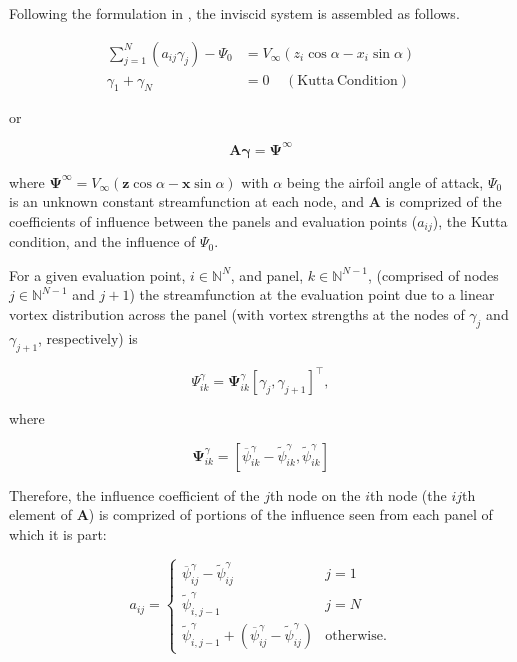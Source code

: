 \documentclass[]{article}
\newcommand{\vect}{\mathbf}
\begin{document}
Following the formulation in \cite{fidkowski_coupled_2022}, the inviscid system is assembled as follows.

\begin{equation}
\begin{aligned}
	\sum_{j=1}^N(a_{ij}\gamma_j) - \Psi_0 &= V_\infty(z_i\cos\alpha - x_i\sin\alpha) \\
	\gamma_1 + \gamma_N &= 0 ~~~~~\mathrm{(Kutta~Condition)}
\end{aligned}
\end{equation}

\noindent or

\begin{equation}
	\mathbf{A} \mathbf{\gamma} = \mathbf{\Psi}^\infty
\end{equation}

\noindent where \(\mathbf{\Psi}^\infty = V_\infty(\vect{z}\cos\alpha - \vect{x} \sin\alpha)\) with \(\alpha\) being the airfoil angle of attack, \(\Psi_0\) is an unknown constant streamfunction at each node, and  \(\mathbf{A}\) is comprized of the coefficients of influence between the panels and evaluation points (\(a_{ij}\)), the Kutta condition, and the influence of \(\Psi_0\).

For a given evaluation point, \(i \in \mathbb{N}^N\), and panel, \(k \in \mathbb{N}^{N-1}\), (comprised of nodes \(j \in \mathbb{N}^{N-1}\) and \(j+1\)) the streamfunction at the evaluation point due to a linear vortex distribution across the panel (with vortex strengths at the nodes of \(\gamma_j\) and \(\gamma_{j+1}\), respectively) is

\begin{equation}
	\Psi_{ik}^\gamma = \mathbf{\Psi}^\gamma_{ik} [\gamma_j, \gamma_{j+1}]^\top,
\end{equation}

\noindent where

\begin{equation}
	\mathbf{\Psi}^\gamma_{ik} = \left[\overline{\psi}^\gamma_{ik} - \widetilde{\psi}^\gamma_{ik}, \widetilde{\psi}^\gamma_{ik} \right]
\end{equation}

\noindent Therefore, the influence coefficient of the \(j\)th node on the \(i\)th node (the \(ij\)th element of \(\mathbf{A}\)) is comprized of portions of the influence seen from each panel of which it is part:

\begin{equation}
	a_{ij} = \begin{cases}
		\overline{\psi}^\gamma_{ij} -  \widetilde{\psi}^\gamma_{ij} & j = 1 \\
		\widetilde{\psi}^\gamma_{i,j-1} & j = N \\
		\widetilde{\psi}^\gamma_{i,j-1} + \left(\overline{\psi}^\gamma_{ij} -  \widetilde{\psi}^\gamma_{ij}\right) & \mathrm{otherwise}.
	\end{cases}
\end{equation}
\end{document}
